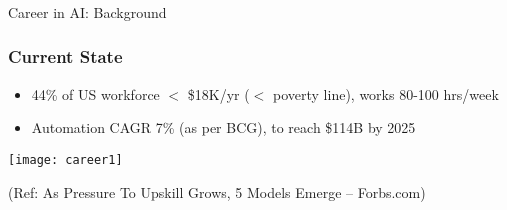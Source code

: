 \begin{frame}[fragile]\frametitle{}
\begin{center}
{\Large Career in AI: Background}
\end{center}
\end{frame}


\begin{frame}[fragile]\frametitle{Current State}
\begin{itemize}
\item 44\% of US workforce $<$ \$18K/yr ($<$ poverty line), works 80-100 hrs/week
\item Automation CAGR 7\% (as per BCG), to reach \$114B by 2025
\end{itemize}

\begin{center}
\texttt{[image: career1]}
\end{center}

{\tiny (Ref: As Pressure To Upskill Grows, 5 Models Emerge – Forbs.com)}
\end{frame}









